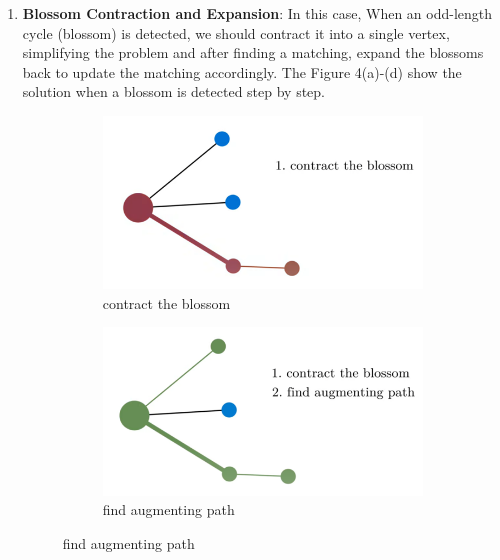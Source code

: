 \documentclass[
    a4paper, %
    10pt, %
    unnumberedsections, %
    twoside, %
]{LTJournalArticle}
\begin{document}
\begin{enumerate}
    \item \textbf{Blossom Contraction and Expansion}: In this case, When an odd-length cycle (blossom) is detected, we should contract it into a single vertex, simplifying the problem and after finding a matching, expand the blossoms back to update the matching accordingly. The Figure 4(a)-(d) show the solution when a blossom is detected step by step.
    \begin{figure}[htbp] %
    \centering  %
    \vspace{0cm}   %
    \setlength{\abovecaptionskip}{0.cm} %
    \setlength{\abovecaptionskip}{0.cm} %
    \setlength{\belowdisplayskip}{3pt}  
    \begin{subfigure}[b]{0.45\linewidth}
        \includegraphics[width=\linewidth]{img/blossom algorithm 8.1.png}
        \caption{contract the blossom}
        \label{fig:subfig1}
    \end{subfigure}
    \hfill
    \begin{subfigure}[b]{0.45\linewidth}
        \includegraphics[width=\linewidth]{img/blossom algorithm 8,2.png}
        \caption{find augmenting path}

\end{subfigure}
\end{figure}
\end{enumerate}
\end{document}

